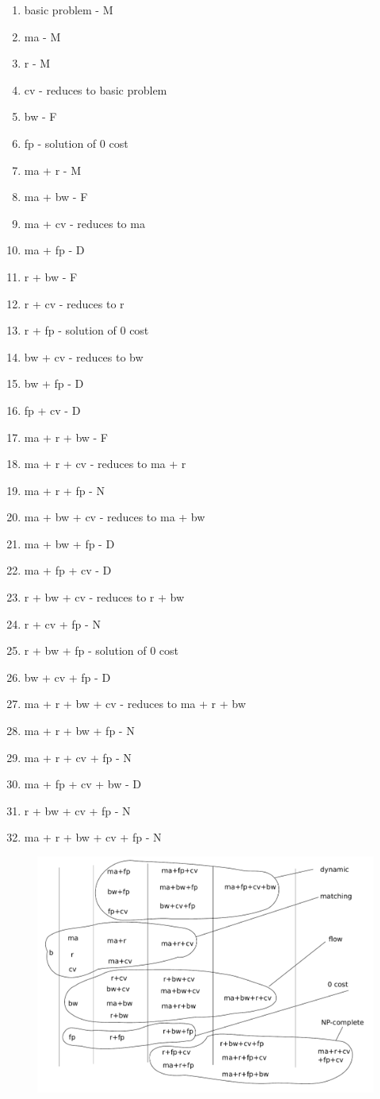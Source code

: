 \begin{enumerate}
\item basic problem - M
\item ma - M
\item r - M
\item cv - reduces to basic problem
\item bw - F
\item fp - solution of 0 cost
\item ma + r - M
\item  ma + bw - F
\item ma + cv - reduces to ma
\item ma + fp - D
\item r + bw - F
\item r + cv - reduces to r
\item r + fp - solution of 0 cost
\item bw + cv - reduces to bw
\item bw + fp - D
\item fp + cv - D
\item ma + r + bw - F
\item ma + r + cv - reduces to ma + r
\item ma + r + fp - N
\item ma + bw + cv - reduces to ma + bw
\item ma + bw + fp - D
\item ma + fp + cv - D
\item r + bw + cv - reduces to r + bw
\item r + cv + fp - N
\item r + bw + fp - solution of 0 cost
\item bw + cv + fp - D
\item ma + r + bw + cv - reduces to ma + r + bw
\item ma + r + bw + fp - N
\item ma + r + cv + fp - N
\item ma + fp + cv + bw - D
\item r + bw + cv + fp - N
\item ma + r + bw + cv + fp - N
\end{enumerate}


\begin{figure}[htbp]
\includegraphics[width = \columnwidth]{figs/summary.pdf}
\end{figure}

